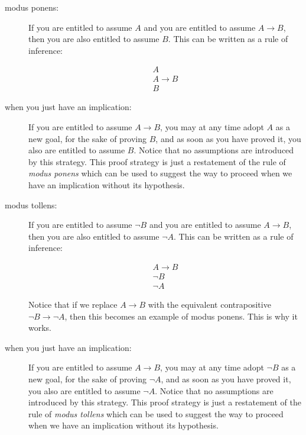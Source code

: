 \documentclass[12pt]{book}
\begin{document}
\begin{description}

\item[modus ponens:]  If you are entitled to assume $A$ and you are entitled to assume $A \rightarrow B$, then 
you are also entitled to assume $B$.  This can be written as a rule of inference:

$$\begin{array}{l} A \\A \rightarrow  B \\ \hline B \end{array}$$

\item[when you just have an implication:]  If you are entitled to assume $A \rightarrow B$, you may at any time adopt $A$ as a new goal, for the sake of proving $B$, and as soon as you have proved it, you also are entitled to assume $B$.  Notice that no assumptions are introduced by this strategy.  This proof strategy is just a restatement of the rule of {\em modus ponens\/} which can be used to suggest the way to proceed when we have an implication without its hypothesis.

\item[modus tollens:]  If you are entitled to assume $\neg B$ and you are entitled to assume $A \rightarrow B$, then 
you are also entitled to assume $\neg A$.  This can be written as a rule of inference:

$$\begin{array}{l} A \rightarrow  B \\ \neg B \\ \hline \neg A \end{array}$$

Notice that if we replace $A \rightarrow B$ with the equivalent contrapositive $\neg B \rightarrow \neg A$, then this becomes an example of modus ponens.  This is why it works.

\item[when you just have an implication:]  If you are entitled to assume $A \rightarrow B$, you may at any time adopt $\neg B$ as a new goal, for the sake of proving $\neg A$, and as soon as you have proved it, you also are entitled to assume $\neg A$.  Notice that no assumptions are introduced by this strategy.  This proof strategy is just a restatement of the rule of {\em modus tollens\/} which can be used to suggest the way to proceed when we have an implication without its hypothesis.

\end{description}
\end{document}
